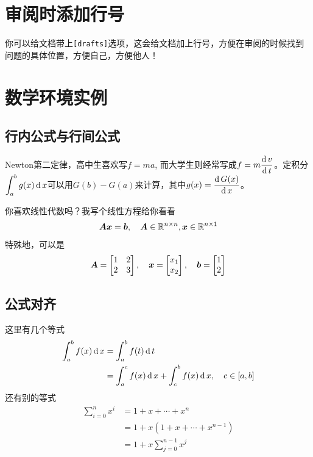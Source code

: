 \section{审阅时添加行号}
你可以给文档带上\verb|[drafts]|选项，这会给文档加上行号，方便在审阅的时候找到问题的具体位置，方便自己，方便他人！


\section{数学环境实例}

\subsection{行内公式与行间公式}

Newton第二定律，高中生喜欢写$f=ma$, 而大学生则经常写成$\displaystyle{f=m\frac{\operatorname{\mathrm{d}}{v}}{\operatorname{\mathrm{d}}{t}}}$。定积分
$\displaystyle{\int^b_a g(x)\operatorname{\mathrm{d}}x}$可以用$G(b)-G(a)$来计算，其中$\displaystyle g(x) = \frac{\operatorname{\mathrm{d}} {G(x)}}{\operatorname{\mathrm{d}} {x}}$。

你喜欢线性代数吗？我写个线性方程给你看看
\begin{equation}
\bm{A} \bm{x}= \bm{b}, \quad \bm{A}\in \mathbb{R}^{{n}\times {n}}, \bm{x}\in \mathbb{R}^{{n}\times {1}}
\end{equation}
特殊地，可以是
\begin{equation}
\bm{A} = \begin{bmatrix}
1 & 2 \\
2 & 3 
\end{bmatrix},\quad
\bm{x}=\begin{bmatrix}
x_1 \\ x_2
\end{bmatrix}, \quad
\bm{b} =\begin{bmatrix}
1 \\ 2
\end{bmatrix}
\end{equation}

\subsection{公式对齐}

这里有几个等式
\begin{equation}
\begin{split}
\int^b_a f(x)\operatorname{\mathrm{d}} x 
& = \int^b_a f(t)\operatorname{\mathrm{d}} t \\
& = \int^c_a f(x)\operatorname{\mathrm{d}} x + \int^b_c f(x)\operatorname{\mathrm{d}} x, \quad c\in [a,b] 
\end{split}
\end{equation}
还有别的等式
\begin{align}
\sum^n_{i=0} x^i 
&= 1 + x + \cdots + x^n \\
&= 1 + x(1 + x + \cdots + x^{n-1}) \\
& = 1 + x \sum^{n-1}_{j=0} x^j
\end{align}

